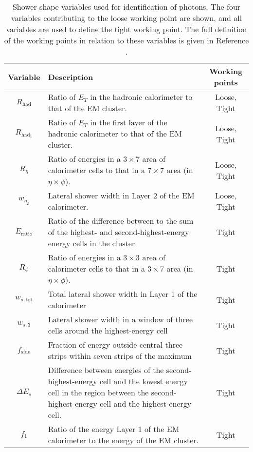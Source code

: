 \begin{table}[tbp]
  \centering
  \renewcommand\arraystretch{1.3}
  \caption{
    Shower-shape variables used for identification of photons. The four
    variables contributing to the loose working point are shown, and all
    variables are used to define the tight working point. The full definition of
    the working points in relation to these variables is given in Reference
    \cite{ATLASegamPerf2019}.
  }
  \begin{tabular}{c|p{8cm}|c}
    \hline\hline
    Variable & Description & Working points\\
    \hline
    $R_\text{had}$     &    
    Ratio of $E_T$ in the hadronic calorimeter to that of the \acs{EM} cluster.
    & Loose, Tight \\
    $R_{\text{had}_1}$ &
    Ratio of $E_T$ in the first layer of the hadronic calorimeter to that
    of the \acs{EM} cluster.
    & Loose, Tight \\
    $R_\eta$           &
    Ratio of energies in a $3\times7$ area of calorimeter cells to that in a
    $7\times7$ area (in $\eta\times\phi$).
    & Loose, Tight \\
    $w_{\eta_2}$       &
    Lateral shower width in Layer 2 of the \ac{EM} calorimeter.
    & Loose, Tight \\
    $E_\text{ratio}$   &
    Ratio of the difference between to the sum of the highest- and
    second-highest-energy energy cells in the cluster.
    & Tight \\
    $R_\phi$           &
    Ratio of energies in a $3\times3$ area of calorimeter cells to that in a
    $3\times7$ area (in $\eta\times\phi$).
    & Tight \\
    $w_{s,\text{tot}}$ &
    Total lateral shower width in Layer 1 of the calorimeter
    & Tight \\
    $w_{s,3}$          &
    Lateral shower width in a window of three cells around the highest-energy cell
    & Tight \\
    $f_\text{side}$    &
    Fraction of energy outside central three strips within seven strips of the
    maximum
    & Tight \\
    $\Delta E_s$       &
    Difference between energies of the second-highest-energy cell and the lowest
    energy cell in the region between the second-highest-energy cell and the
    highest-energy cell.
    & Tight \\
    $f_1$              &
    Ratio of the energy Layer 1 of the \ac{EM} calorimeter to the energy of the
    \ac{EM} cluster.
    & Tight \\
    \hline\hline
  \end{tabular}
  \label{tab:methods-reconstruction-photonIDvars}
\end{table}

